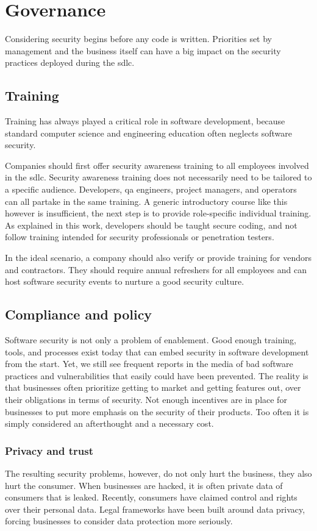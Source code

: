 \section{Governance}
\label{sec:related-plan}
Considering security begins before any code is written.
Priorities set by management and the business itself can have a big impact on the security practices deployed during the \gls{sdlc}.

\subsection{Training}
Training has always played a critical role in software development, because standard computer science and engineering education often neglects software security.

Companies should first offer security awareness training to all employees involved in the \gls{sdlc}.
Security awareness training does not necessarily need to be tailored to a specific audience.
Developers, \gls{qa} engineers, project managers, and operators can all partake in the same training.
A generic introductory course like this however is insufficient, the next step is to provide role-specific individual training.
As explained in this work, developers should be taught secure coding, and not follow training intended for security professionals or penetration testers.

In the ideal scenario, a company should also verify or provide training for vendors and contractors.
They should require annual refreshers for all employees and can host software security events to nurture a good security culture.

\subsection{Compliance and policy}
Software security is not only a problem of enablement.
Good enough training, tools, and processes exist today that can embed security in software development from the start.
Yet, we still see frequent reports in the media of bad software practices and vulnerabilities that easily could have been prevented.
The reality is that businesses often prioritize getting to market and getting features out, over their obligations in terms of security.
Not enough incentives are in place for businesses to put more emphasis on the security of their products.
Too often it is simply considered an afterthought and a necessary cost.

\subsubsection{Privacy and trust}
The resulting security problems, however, do not only hurt the business, they also hurt the consumer.
When businesses are hacked, it is often private data of consumers that is leaked.
Recently, consumers have claimed control and rights over their personal data.
Legal frameworks have been built around data privacy, forcing businesses to consider data protection more seriously.

